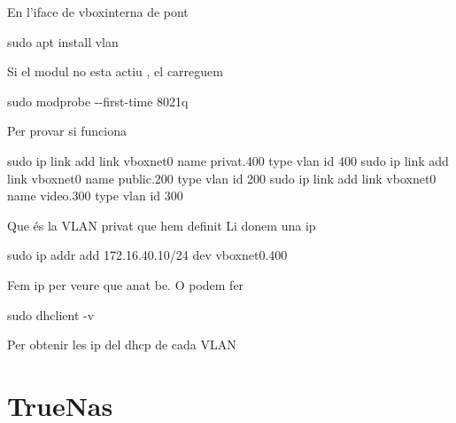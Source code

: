 \documentclass[
  10pt,
]{krantz}
\newenvironment{Shaded}{\begin{snugshade}}{\end{snugshade}}
\newcommand{\AttributeTok}[1]{\textcolor[rgb]{0.77,0.63,0.00}{#1}}
\newcommand{\FunctionTok}[1]{\textcolor[rgb]{0.00,0.00,0.00}{#1}}
\newcommand{\NormalTok}[1]{#1}
\begin{document}
En l'iface de vboxinterna de pont

\begin{Shaded}
\begin{Highlighting}[]
\FunctionTok{sudo}\NormalTok{ apt install vlan}
\end{Highlighting}
\end{Shaded}

Si el modul no esta actiu , el carreguem

\begin{Shaded}
\begin{Highlighting}[]
\FunctionTok{sudo}\NormalTok{ modprobe }\AttributeTok{{-}{-}first{-}time}\NormalTok{ 8021q}
\end{Highlighting}
\end{Shaded}

Per provar si funciona

\begin{Shaded}
\begin{Highlighting}[]
\FunctionTok{sudo}\NormalTok{ ip link add link vboxnet0 name privat.400 type vlan id 400}
\FunctionTok{sudo}\NormalTok{ ip link add link vboxnet0 name public.200 type vlan id 200}
\FunctionTok{sudo}\NormalTok{ ip link add link vboxnet0 name video.300 type vlan id 300}
\end{Highlighting}
\end{Shaded}

Que és la VLAN privat que hem definit Li donem una ip

\begin{Shaded}
\begin{Highlighting}[]
\FunctionTok{sudo}\NormalTok{ ip addr add 172.16.40.10/24 dev vboxnet0.400}
\end{Highlighting}
\end{Shaded}

Fem ip per veure que anat be. O podem fer

\begin{Shaded}
\begin{Highlighting}[]
\FunctionTok{sudo}\NormalTok{ dhclient }\AttributeTok{{-}v}
\end{Highlighting}
\end{Shaded}

Per obtenir les ip del dhcp de cada VLAN

\hypertarget{truenas}{%
\chapter{TrueNas}\label{truenas}}
\end{document}
